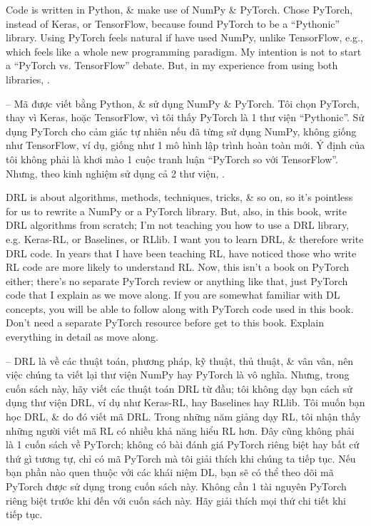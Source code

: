 \documentclass{article}
\begin{document}
\begin{itemize}
\begin{itemize}
\begin{itemize}
            Code is written in Python, \& make use of NumPy \& PyTorch. Chose PyTorch, instead of Keras, or TensorFlow, because found PyTorch to be a ``Pythonic'' library. Using PyTorch feels natural if have used NumPy, unlike TensorFlow, e.g., which feels like a whole new programming paradigm. My intention is not to start a ``PyTorch vs. TensorFlow'' debate. But, in my experience from using both libraries, .

            -- Mã được viết bằng Python, \& sử dụng NumPy \& PyTorch. Tôi chọn PyTorch, thay vì Keras, hoặc TensorFlow, vì tôi thấy PyTorch là 1 thư viện ``Pythonic''. Sử dụng PyTorch cho cảm giác tự nhiên nếu đã từng sử dụng NumPy, không giống như TensorFlow, ví dụ, giống như 1 mô hình lập trình hoàn toàn mới. Ý định của tôi không phải là khơi mào 1 cuộc tranh luận ``PyTorch so với TensorFlow''. Nhưng, theo kinh nghiệm sử dụng cả 2 thư viện, .

            DRL is about algorithms, methods, techniques, tricks, \& so on, so it's pointless for us to rewrite a NumPy or a PyTorch library. But, also, in this book, write DRL algorithms from scratch; I'm not teaching you how to use a DRL library, e.g. Keras-RL, or Baselines, or RLlib. I want you to learn DRL, \& therefore write DRL code. In years that I have been teaching RL, have noticed those who write RL code are more likely to understand RL. Now, this isn't a book on PyTorch either; there's no separate PyTorch review or anything like that, just PyTorch code that I explain as we move along. If you are somewhat familiar with DL concepts, you will be able to follow along with PyTorch code used in this book. Don't need a separate PyTorch resource before get to this book. Explain everything in detail as move along.

            -- DRL là về các thuật toán, phương pháp, kỹ thuật, thủ thuật, \& vân vân, nên việc chúng ta viết lại thư viện NumPy hay PyTorch là vô nghĩa. Nhưng, trong cuốn sách này, hãy viết các thuật toán DRL từ đầu; tôi không dạy bạn cách sử dụng thư viện DRL, ví dụ như Keras-RL, hay Baselines hay RLlib. Tôi muốn bạn học DRL, \& do đó viết mã DRL. Trong những năm giảng dạy RL, tôi nhận thấy những người viết mã RL có nhiều khả năng hiểu RL hơn. Đây cũng không phải là 1 cuốn sách về PyTorch; không có bài đánh giá PyTorch riêng biệt hay bất cứ thứ gì tương tự, chỉ có mã PyTorch mà tôi giải thích khi chúng ta tiếp tục. Nếu bạn phần nào quen thuộc với các khái niệm DL, bạn sẽ có thể theo dõi mã PyTorch được sử dụng trong cuốn sách này. Không cần 1 tài nguyên PyTorch riêng biệt trước khi đến với cuốn sách này. Hãy giải thích mọi thứ chi tiết khi tiếp tục.


\end{itemize}
\end{itemize}
\end{itemize}
\end{document}
